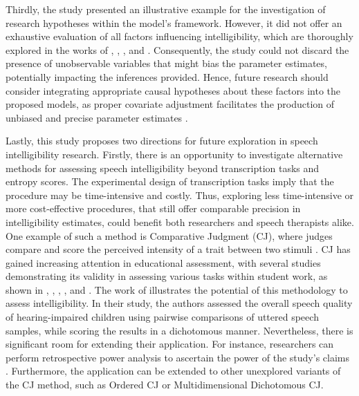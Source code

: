 \documentclass[
  authoryear,
  preprint,
  1p]{elsarticle}
\begin{document}
Thirdly, the study presented an illustrative example for the
investigation of research hypotheses within the model's framework.
However, it did not offer an exhaustive evaluation of all factors
influencing intelligibility, which are thoroughly explored in the works
of \citet{Niparko_et_al_2010}, \citet{Boons_et_al_2012},
\citet{Gillis_2018}, and \citet{Fagan_et_al_2020}. Consequently, the
study could not discard the presence of unobservable variables that
might bias the parameter estimates, potentially impacting the inferences
provided. Hence, future research should consider integrating appropriate
causal hypotheses about these factors into the proposed models, as
proper covariate adjustment facilitates the production of unbiased and
precise parameter estimates
\citep{Cinelli_et_al_2021, Deffner_et_al_2022}.

Lastly, this study proposes two directions for future exploration in
speech intelligibility research. Firstly, there is an opportunity to
investigate alternative methods for assessing speech intelligibility
beyond transcription tasks and entropy scores. The experimental design
of transcription tasks imply that the procedure may be time-intensive
and costly. Thus, exploring less time-intensive or more cost-effective
procedures, that still offer comparable precision in intelligibility
estimates, could benefit both researchers and speech therapists alike.
One example of such a method is Comparative Judgment (CJ), where judges
compare and score the perceived intensity of a trait between two stimuli
\citep{Thurstone_1927}. CJ has gained increasing attention in
educational assessment, with several studies demonstrating its validity
in assessing various tasks within student work, as shown in
\citet{Pollitt_2012a}, \citet{Pollitt_2012b}, \citet{Lesterhuis_2018},
\citet{vanDaal_2020}, and \citet{Verhavert_et_al_2019}. The work of
\citet{Boonen_et_al_2020} illustrates the potential of this methodology
to assess intelligibility. In their study, the authors assessed the
overall speech quality of hearing-impaired children using pairwise
comparisons of uttered speech samples, while scoring the results in a
dichotomous manner. Nevertheless, there is significant room for
extending their application. For instance, researchers can perform
retrospective power analysis to ascertain the power of the study's
claims \citep[see][393-394]{Kruschke_2015}. Furthermore, the application
can be extended to other unexplored variants of the CJ method, such as
Ordered CJ \citep{Pritikin_2020} or Multidimensional Dichotomous CJ.
\end{document}
